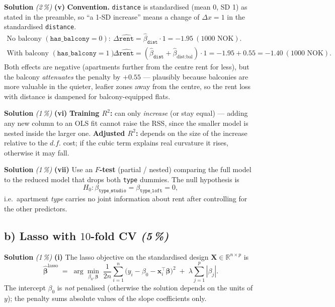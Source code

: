 \documentclass[11pt,a4paper]{article}
\newcommand{\subpoints}[1]{\textit{(#1\,\%)}}
\newcommand{\sol}{\noindent\textbf{Solution}}
\begin{document}
\medskip
\sol{} \subpoints{2} \textbf{(v)} \textbf{Convention.} \texttt{distance} is standardised (mean 0,
SD 1) as stated in the preamble, so ``a 1-SD increase'' means a change of $\Delta x = 1$ in the
standardised \texttt{distance}.
\begin{align*}
\text{No balcony } (\texttt{has\_balcony}=0): &\quad
   \Delta\widehat{\texttt{rent}} = \hat\beta_{\texttt{dist}}\cdot 1 = \boxed{-1.95}\ (\text{1000 NOK}). \\
\text{With balcony } (\texttt{has\_balcony}=1): &\quad
   \Delta\widehat{\texttt{rent}} = (\hat\beta_{\texttt{dist}} + \hat\beta_{\text{dist}:\text{bal}})\cdot 1
      = -1.95 + 0.55 = \boxed{-1.40}\ (\text{1000 NOK}).
\end{align*}
Both effects are negative (apartments further from the centre rent for less), but the balcony
\emph{attenuates} the penalty by $+0.55$ --- plausibly because balconies are more valuable in the
quieter, leafier zones away from the centre, so the rent loss with distance is dampened for
balcony-equipped flats.

\medskip
\sol{} \subpoints{1} \textbf{(vi)} \textbf{Training $R^2$:} can only \emph{increase} (or stay equal)
--- adding any new column to an OLS fit cannot raise the RSS, since the smaller model is nested
inside the larger one. \textbf{Adjusted $R^2$:} depends on the size of the increase relative to the
$d.f.$ cost; if the cubic term explains real curvature it rises, otherwise it may fall.

\medskip
\sol{} \subpoints{1} \textbf{(vii)} Use an \textbf{$F$-test} (partial / nested) comparing the full
model to the reduced model that drops both \texttt{type} dummies. The null hypothesis is
$$H_0: \beta_{\texttt{type\_studio}} = \beta_{\texttt{type\_loft}} = 0,$$
i.e.\ apartment \emph{type} carries no joint information about rent after controlling for the
other predictors.

\subsection*{b) Lasso with $10$-fold CV \subpoints{5}}

\sol{} \subpoints{1} \textbf{(i)} The lasso objective on the standardised design
$\mathbf X\in\mathbb R^{n\times p}$ is
$$\hat{\boldsymbol\beta}^{\text{lasso}}
   \;=\; \arg\min_{\beta_0,\boldsymbol\beta}\;
   \frac{1}{2n}\sum_{i=1}^n\bigl(y_i - \beta_0 - \mathbf x_i^\top\boldsymbol\beta\bigr)^2
   \;+\; \lambda\sum_{j=1}^p |\beta_j|.$$
The intercept $\beta_0$ is \emph{not} penalised (otherwise the solution depends on the units of $y$);
the penalty sums absolute values of the slope coefficients only.
\end{document}
